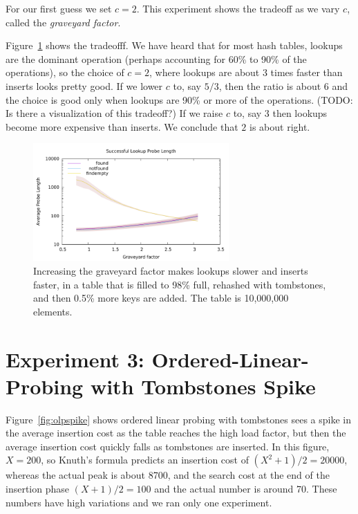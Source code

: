 \documentclass[10pt]{article}
\theoremstyle{remark}
\theoremstyle{remark}
\newcommand{\figref}[1]{Figure~\ref{fig:#1}}
\newcommand{\figlabel}[1]{\label{fig:#1}}
\begin{document}
For our first guess we set $c=2$.  This experiment shows the tradeoff
as we vary $c$, called the \textit{graveyard factor}.

\figref{varytombstones} shows the tradeofff.  We have heard that for
most hash tables, lookups are the dominant operation (perhaps
accounting for 60\% to 90\% of the operations), so the choice of
$c=2$, where lookups are about 3 times faster than inserts looks
pretty good.  If we lower $c$ to, say $5/3$, then the ratio is about
$6$ and the choice is good only when lookups are 90\% or more of the
operations.  (TODO: Is there a visualization of this tradeoff?)  If we
raise $c$ to, say $3$ then lookups become more expensive than inserts.
We conclude that $2$ is about right.

\begin{figure}
  \begin{center}
  \includegraphics[width=75mm]{experiments/vary-tombstones}
  \end{center}
  \caption{Increasing the graveyard factor makes lookups slower and
    inserts faster, in a table that is filled to 98\% full, rehashed
    with tombstones, and then 0.5\% more keys are added.  The table is
    10,000,000 elements.}
  \figlabel{varytombstones}
\end{figure}

\section{Experiment 3: Ordered-Linear-Probing with Tombstones Spike}

\figref{olpspike} shows ordered linear probing with tombstones sees a
spike in the average insertion cost as the table reaches the high load
factor, but then the average insertion cost quickly falls as
tombstones are inserted.  In this figure, $X=200$, so Knuth's formula
predicts an insertion cost of $(X^2+1)/2=20000$, whereas the actual
peak is about 8700, and the search cost at the end of the insertion
phase $(X+1)/2 = 100$ and the actual number is around 70.  These
numbers have high variations and we ran only one experiment.
\end{document}
